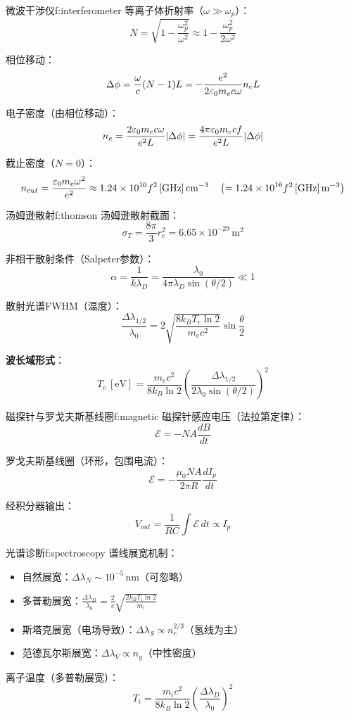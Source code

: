 \begin{formulabox}{微波干涉仪}{f:interferometer}
等离子体折射率（$\omega \gg \omega_p$）：
\begin{equation}
    N = \sqrt{1 - \frac{\omega_p^2}{\omega^2}} \approx 1 - \frac{\omega_p^2}{2\omega^2}
\label{eq:ch12-refractive-index-ex}
\end{equation}

相位移动：
\[
    \Delta\phi = \frac{\omega}{c}(N-1)L = -\frac{e^2}{2\varepsilon_0 m_e c \omega} n_e L
\]

电子密度（由相位移动）：
\[
    n_e = \frac{2\varepsilon_0 m_e c \omega}{e^2 L} |\Delta\phi| = \frac{4\pi\varepsilon_0 m_e c f}{e^2 L} |\Delta\phi|
\]

截止密度（$N=0$）：
\[
    n_{cut} = \frac{\varepsilon_0 m_e \omega^2}{e^2} \approx 1.24\times10^{10} f^2\,[\mathrm{GHz}]
\,\mathrm{cm^{-3}} \quad\left(= 1.24\times10^{16} f^2\,[\mathrm{GHz}]\,\mathrm{m^{-3}}\right)
\]
\end{formulabox}

\begin{formulabox}{汤姆逊散射}{f:thomson}
汤姆逊散射截面：
\[
    \sigma_T = \frac{8\pi}{3} r_e^2 = 6.65\times10^{-29}\,\mathrm{m^2}
\]

非相干散射条件（Salpeter参数）：
\[
    \alpha = \frac{1}{k\lambda_D} = \frac{\lambda_0}{4\pi\lambda_D\sin(\theta/2)} \ll 1
\]

散射光谱FWHM（温度）：
\[
    \frac{\Delta\lambda_{1/2}}{\lambda_0} = 2\sqrt{\frac{8k_B T_e \ln 2}{m_e c^2}} \sin\frac{\theta}{2}
\]

\textbf{波长域形式}：
\[
    T_e\,[\mathrm{eV}] = \frac{m_e c^2}{8k_B \ln 2} \left(\frac{\Delta\lambda_{1/2}}{2\lambda_0 \sin(\theta/2)}\right)^2
\]
\end{formulabox}

\begin{formulabox}{磁探针与罗戈夫斯基线圈}{f:magnetic}
磁探针感应电压（法拉第定律）：
\[
    \mathcal{E} = -N A \frac{dB}{dt}
\]

罗戈夫斯基线圈（环形，包围电流）：
\[
    \mathcal{E} = -\frac{\mu_0 N A}{2\pi R} \frac{dI_p}{dt}
\]

经积分器输出：
\[
    V_{out} = \frac{1}{RC} \int \mathcal{E}\,dt \propto I_p
\]
\end{formulabox}

\begin{formulabox}{光谱诊断}{f:spectroscopy}
谱线展宽机制：
\begin{itemize}
    \item 自然展宽：$\Delta\lambda_N \sim 10^{-5}\,\mathrm{nm}$（可忽略）
    \item 多普勒展宽：$\frac{\Delta\lambda_D}{\lambda_0} = \frac{2}{c}\sqrt{\frac{2k_B T_i \ln 2}{m_i}}$
    \item 斯塔克展宽（电场导致）：$\Delta\lambda_S \propto n_e^{2/3}$（氢线为主）
    \item 范德瓦尔斯展宽：$\Delta\lambda_V \propto n_g$（中性密度）
\end{itemize}

离子温度（多普勒展宽）：
\[
    T_i = \frac{m_i c^2}{8k_B \ln 2} \left(\frac{\Delta\lambda_D}{\lambda_0}\right)^2
\]
\end{formulabox}

